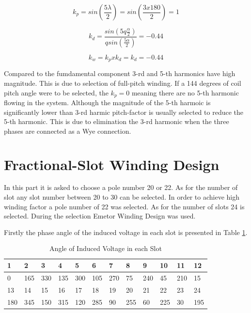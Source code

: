 \documentclass{article}
\begin{document}
\begin{equation}
k_p=sin(\frac{5\lambda}{2})=sin(\frac{3x180}{2})=1
\label{eq:kd5_integral}
\end{equation}


\begin{equation}
k_d=\frac{sin(5q\frac{\alpha}{2})}{qsin(\frac{5\alpha}{2})}=-0.44
\label{eq:kp5_integral}
\end{equation}

\begin{equation}
k_w=k_pxk_d=k_d= -0.44
\label{eq:qkw5_integral}
\end{equation}


Compared to the fumdamental component 3-rd and 5-th harmonics have high magnitude. This is due to selection of full-pitch winding. If a 144 degrees of coil pitch angle were to be selected, the $k_p=0$ meaning there are no 5-th harmonic flowing in the system. Although the magnitude of the 5-th harmoic is significantly lower than 3-rd harmic pitch-factor is usually selected to reduce the 5-th harmonic. This is due to elimination the 3-rd harmonic when the three phases are connected as a Wye connection.


\section{Fractional-Slot Winding Design}

In this part it is asked to choose a pole number 20 or 22. As for the number of slot any slot number between 20 to 30 can be selected. In order to achieve high winding factor a pole number of 22 was selected. As for the number of slots 24 is selected. During the selection Emetor Winding Design was used.

Firstly the phase angle of the induced voltage in each slot is presented in Table \ref{tab:voltageangle22-24}. 

\begin{table}[H]
	\caption{Angle of Induced Voltage in each Slot}
	\label{tab:voltageangle22-24}
	\begin{tabular}{llllllllllll}
	1	&  2& 3 &4  & 5 & 6 & 7 & 8 & 9 & 10 & 11 & 12 \\
	\hline
	0& 165 &330 &135 &300 &105& 270 &75 &240 &45& 210& 15 \\
		\hline
	13	& 14 & 15 &16  &17  &18  &19  &20  &21  &22  &23  &24  \\
		\hline
	180 &345 &150 &315& 120 &285& 90& 255 &60 &225 &30 &195
	\end{tabular}
\end{table}
\end{document}
